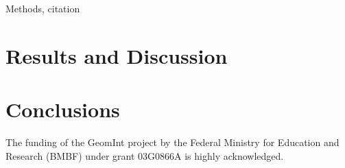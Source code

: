 \documentclass{svjour3}                     %
\begin{document}
Methods, citation \cite{Shirzadi2017a}

\section{Results and Discussion}
\label{sec:results}

\section{Conclusions}
\label{sec:conclusions}

\begin{acknowledgements}
The funding of the GeomInt project by the Federal Ministry for Education and Research (BMBF) under grant 03G0866A is highly acknowledged.
\end{acknowledgements}
%
%

%
\end{document}
